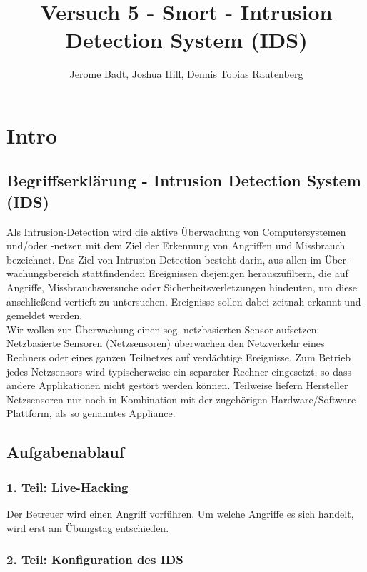 \documentclass[a4paper]{report}
\title{Versuch 5 - Snort - Intrusion Detection System (IDS)}
\author{Jerome Badt, Joshua Hill, Dennis Tobias Rautenberg}
\begin{document}
\maketitle

\chapter{Intro}

\section{Begriffserklärung -  Intrusion Detection System (IDS)}
Als Intrusion-Detection wird die aktive Überwachung von Computersystemen und/oder
-netzen mit dem Ziel der Erkennung von Angriffen und Missbrauch bezeichnet. Das Ziel
von Intrusion-Detection besteht darin, aus allen im Über-wachungsbereich stattfindenden
Ereignissen diejenigen herauszufiltern, die auf Angriffe, Missbrauchsversuche oder
Sicherheitsverletzungen hindeuten, um diese anschließend vertieft zu untersuchen.
Ereignisse sollen dabei zeitnah erkannt und gemeldet werden.\\
Wir wollen zur Überwachung einen sog. netzbasierten Sensor aufsetzen: Netzbasierte
Sensoren (Netzsensoren) überwachen den Netzverkehr eines Rechners oder eines
ganzen Teilnetzes auf verdächtige Ereignisse. Zum Betrieb jedes Netzsensors wird
typischerweise ein separater Rechner eingesetzt, so dass andere Applikationen nicht
gestört werden können. Teilweise liefern Hersteller Netzsensoren nur noch in Kombination
mit der zugehörigen Hardware/Software-Plattform, als so genanntes Appliance.

\section{Aufgabenablauf}
\subsection{1. Teil: Live-Hacking}
Der Betreuer wird einen Angriff vorführen. Um welche Angriffe es sich handelt, wird erst
am Übungstag entschieden.

\subsection{2. Teil: Konfiguration des IDS}
\end{document}
